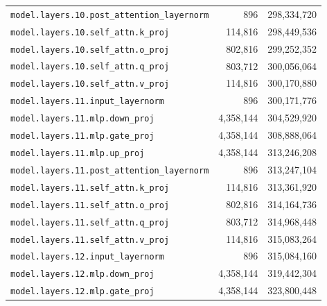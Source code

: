 \documentclass[10pt,a4paper]{article}
\theoremstyle{definition}
\begin{document}
\begin{appendices}
\begin{longtable}{p{9.5cm}rr}
\texttt{model.\allowbreak{}layers.\allowbreak{}10.\allowbreak{}post\_attention\_layernorm} & 896 & 298,334,720 \\
\texttt{model.\allowbreak{}layers.\allowbreak{}10.\allowbreak{}self\_attn.\allowbreak{}k\_proj} & 114,816 & 298,449,536 \\
\texttt{model.\allowbreak{}layers.\allowbreak{}10.\allowbreak{}self\_attn.\allowbreak{}o\_proj} & 802,816 & 299,252,352 \\
\texttt{model.\allowbreak{}layers.\allowbreak{}10.\allowbreak{}self\_attn.\allowbreak{}q\_proj} & 803,712 & 300,056,064 \\
\texttt{model.\allowbreak{}layers.\allowbreak{}10.\allowbreak{}self\_attn.\allowbreak{}v\_proj} & 114,816 & 300,170,880 \\
\texttt{model.\allowbreak{}layers.\allowbreak{}11.\allowbreak{}input\_layernorm} & 896 & 300,171,776 \\
\texttt{model.\allowbreak{}layers.\allowbreak{}11.\allowbreak{}mlp.\allowbreak{}down\_proj} & 4,358,144 & 304,529,920 \\
\texttt{model.\allowbreak{}layers.\allowbreak{}11.\allowbreak{}mlp.\allowbreak{}gate\_proj} & 4,358,144 & 308,888,064 \\
\texttt{model.\allowbreak{}layers.\allowbreak{}11.\allowbreak{}mlp.\allowbreak{}up\_proj} & 4,358,144 & 313,246,208 \\
\texttt{model.\allowbreak{}layers.\allowbreak{}11.\allowbreak{}post\_attention\_layernorm} & 896 & 313,247,104 \\
\texttt{model.\allowbreak{}layers.\allowbreak{}11.\allowbreak{}self\_attn.\allowbreak{}k\_proj} & 114,816 & 313,361,920 \\
\texttt{model.\allowbreak{}layers.\allowbreak{}11.\allowbreak{}self\_attn.\allowbreak{}o\_proj} & 802,816 & 314,164,736 \\
\texttt{model.\allowbreak{}layers.\allowbreak{}11.\allowbreak{}self\_attn.\allowbreak{}q\_proj} & 803,712 & 314,968,448 \\
\texttt{model.\allowbreak{}layers.\allowbreak{}11.\allowbreak{}self\_attn.\allowbreak{}v\_proj} & 114,816 & 315,083,264 \\
\texttt{model.\allowbreak{}layers.\allowbreak{}12.\allowbreak{}input\_layernorm} & 896 & 315,084,160 \\
\texttt{model.\allowbreak{}layers.\allowbreak{}12.\allowbreak{}mlp.\allowbreak{}down\_proj} & 4,358,144 & 319,442,304 \\
\texttt{model.\allowbreak{}layers.\allowbreak{}12.\allowbreak{}mlp.\allowbreak{}gate\_proj} & 4,358,144 & 323,800,448 \\

\end{longtable}
\end{appendices}
\end{document}
